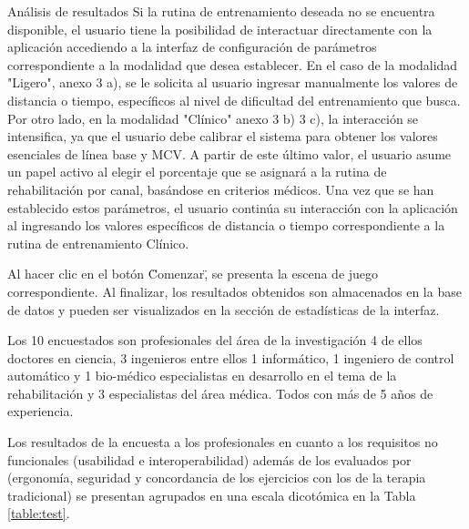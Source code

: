 \begin{thesischapter}{3} {Análisis de resultados}
    \vspace{10pt}
    Si la rutina de entrenamiento deseada no se encuentra disponible, el usuario tiene la posibilidad de interactuar 
    directamente con la aplicación accediendo a la interfaz de configuración de parámetros correspondiente a la modalidad 
    que desea establecer. En el caso de la modalidad "Ligero", anexo 3 a), se le solicita al usuario ingresar manualmente los valores 
    de distancia o tiempo, específicos al nivel de dificultad del entrenamiento que busca. Por otro lado, en la modalidad 
    "Clínico" anexo 3 b) 3 c), la interacción se intensifica, ya que el usuario debe calibrar el sistema para obtener los valores esenciales 
    de línea base y MCV. A partir de este último valor, el usuario asume un papel activo al elegir el porcentaje que se 
    asignará a la rutina de rehabilitación por canal, basándose en criterios médicos. Una vez que se han establecido estos parámetros, el usuario continúa su interacción con la aplicación al ingresando los 
    valores específicos de distancia o tiempo correspondiente a la rutina de entrenamiento Clínico. 
    
    \vspace{10pt}
    Al hacer clic en el botón \"Comenzar\", se presenta la escena de juego correspondiente. Al finalizar, los resultados obtenidos son almacenados en la base de datos 
    y pueden ser visualizados en la sección de estadísticas de la interfaz. 
    
    \newpage 
    Los 10 encuestados son profesionales del área de la investigación 4 de ellos doctores en ciencia,
    3 ingenieros entre ellos 1 informático, 1 ingeniero de control automático y 1 bio-médico especialistas en desarrollo 
    en el tema de la rehabilitación y 3 especialistas del área médica. Todos con más de 5 años de experiencia.
    
    \vspace{10pt}
    Los resultados de la encuesta a los profesionales en cuanto a los requisitos no funcionales (usabilidad e interoperabilidad) 
    además de los evaluados por \cite{franco2016sistema} (ergonomía, seguridad y concordancia de los ejercicios con los de la terapia tradicional) 
    se presentan agrupados en una escala dicotómica en la Tabla \ref{table:test}.
    

\end{thesischapter}
